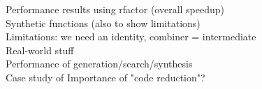 Performance results using rfactor (overall speedup) \\
Synthetic functions (also to show limitations) \\
Limitations: we need an identity, combiner = intermediate \\
Real-world stuff \\
Performance of generation/search/synthesis \\
Case study of Importance of "code reduction"? \\
